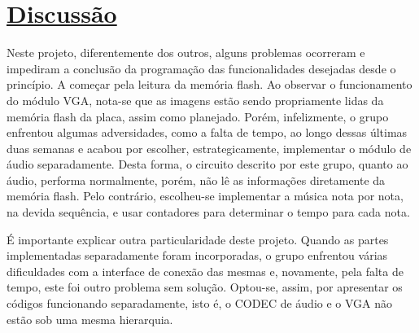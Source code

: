 \documentclass[14pt, oneside]{book}
\newcommand\tab[1][1cm]{\hspace*{#1}}
\theoremstyle{definition}
\begin{document}
            
        \chapter[Discussão]{\hyperlink{toc}{Discussão}} \hypertarget{ana}{}
            \tab Neste projeto, diferentemente dos outros, alguns problemas ocorreram e impediram a conclusão da programação das funcionalidades desejadas desde o princípio. A começar pela leitura da memória flash. Ao observar o funcionamento do módulo VGA, nota-se que as imagens estão sendo propriamente lidas da memória flash da placa, assim como planejado. Porém, infelizmente, o grupo enfrentou algumas adversidades, como a falta de tempo, ao longo dessas últimas duas semanas e acabou por escolher, estrategicamente, implementar o módulo de áudio separadamente. Desta forma, o circuito descrito por este grupo, quanto ao áudio, performa normalmente, porém, não lê as informações diretamente da memória flash. Pelo contrário, escolheu-se implementar a música nota por nota, na devida sequência, e usar contadores para determinar o tempo para cada nota. 
            
         
         
            
            \tab É importante explicar outra particularidade deste projeto. Quando as partes implementadas separadamente foram incorporadas, o grupo enfrentou várias dificuldades com a interface de conexão das mesmas e, novamente, pela falta de tempo, este foi outro problema sem solução. Optou-se, assim, por apresentar os códigos funcionando separadamente, isto é, o CODEC de áudio e o VGA não estão sob uma mesma hierarquia. 
                
\end{document}
